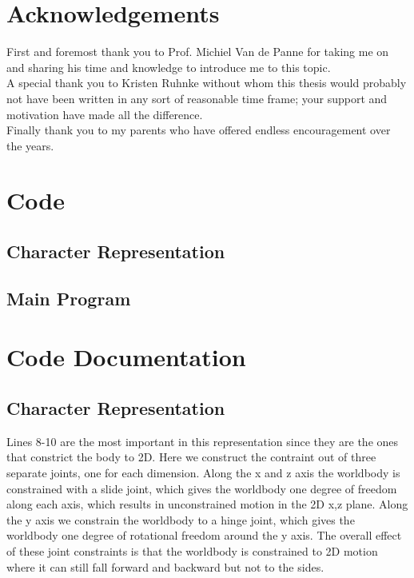 \documentclass[12pt, a4paper]{article}
\begin{document}
\section{Acknowledgements}
First and foremost thank you to Prof. Michiel Van de Panne for taking me on and sharing his time and knowledge to introduce me to this topic.\\

A special thank you to Kristen Ruhnke without whom this thesis would probably not have been written in any sort of reasonable time frame; your support and motivation have made all the difference.\\

Finally thank you to my parents who have offered endless encouragement over the years.


\appendix
\section{Code}
\subsection{Character Representation}
\lstset{breaklines=true,breakatwhitespace = false, basicstyle=\footnotesize, numbers=left}

\subsection{Main Program}



\section{Code Documentation}
\label{apdx: code doc}
\subsection{Character Representation}

Lines 8-10 are the most important in this representation since they are the ones that constrict the body to 2D. Here we construct the contraint out of three separate joints, one for each dimension. Along the x and z axis the worldbody is constrained with a slide joint, which gives the worldbody one degree of freedom along each axis, which results in unconstrained motion in the 2D x,z plane. Along the y axis we constrain the worldbody to a hinge joint, which gives the worldbody one degree of rotational freedom around the y axis. The overall effect of these joint constraints is that the worldbody is constrained to 2D motion where it can still fall forward and backward but not to the sides. \\
\end{document}
